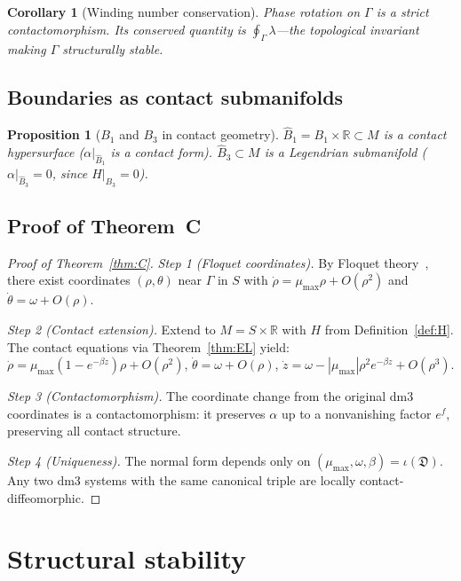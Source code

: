 \documentclass[12pt, oneside]{book}
\theoremstyle{plain}
\newtheorem{corollary}[theorem]{Corollary}
\newtheorem{proposition}[theorem]{Proposition}
\theoremstyle{definition}
\theoremstyle{remark}
\newcommand{\R}{\mathbb{R}}
\newcommand{\dm}{\mathfrak{D}}
\newcommand{\Orb}{\Gamma}
\newcommand{\abs}[1]{\left|#1\right|}
\begin{document}
\begin{corollary}[Winding number conservation]\label{cor:winding}
Phase rotation on $\Orb$ is a strict contactomorphism. Its conserved
quantity is $\oint_\Orb\lambda$---the topological invariant making
$\Orb$ structurally stable.
\end{corollary}

\subsection{Boundaries as contact submanifolds}

\begin{proposition}[$B_1$ and $B_3$ in contact geometry]\label{prop:contact-bdy}
$\hat B_1=B_1\times\R\subset M$ is a contact hypersurface
($\alpha|_{\hat B_1}$ is a contact form).
$\hat B_3\subset M$ is a Legendrian submanifold
($\alpha|_{\hat B_3}=0$, since $H|_{B_3}=0$).
\end{proposition}

\subsection{Proof of Theorem~C}

\begin{proof}[Proof of Theorem~\ref{thm:C}]
\emph{Step 1 (Floquet coordinates).}
By Floquet theory~\cite{GH}, there exist coordinates $(\rho,\theta)$
near $\Orb$ in $S$ with $\dot\rho=\mu_{\max}\rho+O(\rho^2)$ and
$\dot\theta=\omega+O(\rho)$.

\emph{Step 2 (Contact extension).}
Extend to $M=S\times\R$ with $H$ from Definition~\ref{def:H}.
The contact equations via Theorem~\ref{thm:EL} yield:
$\dot\rho=\mu_{\max}(1-e^{-\beta z})\rho+O(\rho^2)$,
$\dot\theta=\omega+O(\rho)$,
$\dot z=\omega-\abs{\mu_{\max}}\rho^2 e^{-\beta z}+O(\rho^3)$.

\emph{Step 3 (Contactomorphism).}
The coordinate change from the original dm3 coordinates is a
contactomorphism: it preserves $\alpha$ up to a nonvanishing
factor $e^f$, preserving all contact structure.

\emph{Step 4 (Uniqueness).}
The normal form depends only on $(\mu_{\max},\omega,\beta)=\iota(\dm)$.
Any two dm3 systems with the same canonical triple are locally
contact-diffeomorphic.
\end{proof}

\section{Structural stability}\label{sec:stability}
\end{document}
